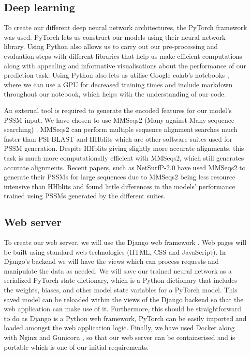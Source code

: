 \documentclass{l4proj}
\begin{document}
\subsection{Deep learning}

To create our different deep neural network architectures, the PyTorch framework \citep{pytorch} was used. PyTorch lets us construct our models using their neural network library. Using Python also allows us to carry out our pre-processing and evaluation steps with different libraries that help us make efficient computations along with appealing and informative visualisations about the performance of our prediction task. Using Python also lets us utilise Google colab’s notebooks \citep{Bisong:19}, where we can use a GPU for decreased training times and include markdown throughout our notebook, which helps with the understanding of our code.

An external tool is required to generate the encoded features for our model's PSSM input. We have chosen to use MMSeqs2 (Many-against-Many sequence searching) \citep{Steinegger:17}. MMSeqs2 can perform multiple sequence alignment searches much faster than PSI-BLAST \citep{Altschul:97} and HHblits \citep{Remmert:12} which are other software suites used for PSSM generation. Despite HHblits giving slightly more accurate alignments, this task is much more computationally efficient with MMSeqs2, which still generates accurate alignments. Recent papers, such as NetSurfP-2.0 \citep{Klausen:19} have used MMSeqs2 to generate their PSSMs for large sequences due to MMSeqs2 being less resource intensive than HHblits and found little differences in the models' performance trained using PSSMs generated by the different suites.

\subsection{Web server}

To create our web server, we will use the Django web framework \citep{Django:05}. Web pages will be built using standard web technologies (HTML, CSS and JavaScript). In Django’s backend we will have the views which can process requests and manipulate the data as needed. We will save our trained neural network as a serialized PyTorch state dictionary, which is a Python dictionary that includes the weights, biases, and other model state variables for a PyTorch model. This saved model can be reloaded within the views of the Django backend so that the web application can make use of it. Furthermore, this should be straightforward to do as Django is a Python web framework, PyTorch can be easily imported and loaded amongst the web application logic. Finally, we have used Docker \citep{Docker:14} along with Nginx \citep{Nginx:08} and Gunicorn \citep{gunicorn:wiki}, so that our web server can be containerised and is portable which is one of our initial requirements. 
\end{document}
